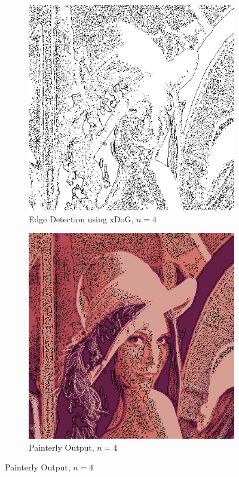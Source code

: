 \documentclass{article}
\begin{document}
\begin{figure}[!ht]
\begin{subfigure}{.5\textwidth}
\centering
\includegraphics[width=.75\linewidth]{xdogsig4.png}
\caption{Edge Detection using xDoG, $n = 4$}
\end{subfigure}
\begin{subfigure}{.5\textwidth}
\centering
\includegraphics[width=.75\linewidth]{pastelsig4.png}
\caption{Painterly Output, $n = 4$}
\end{subfigure}
\end{figure}
\end{document}
